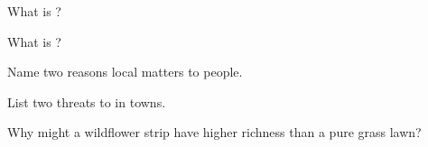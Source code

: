 \begin{exercise}[$\star$]\label{exo:g6:biodiversity:1}
What is ?
\end{exercise}

\begin{exercise}[$\star$]\label{exo:g6:biodiversity:2}
What is ?
\end{exercise}

\begin{exercise}[$\star$]\label{exo:g6:biodiversity:3}
Name two reasons local  matters to people.
\end{exercise}

\begin{exercise}[$\star$]\label{exo:g6:biodiversity:4}
List two threats to  in towns.
\end{exercise}

\begin{exercise}[$\star\star$]\label{exo:g6:biodiversity:5}
Why might a wildflower strip have higher  richness than a pure
grass lawn?
\end{exercise}

